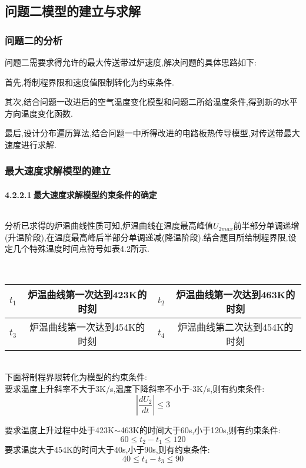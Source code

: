 \documentclass[12pt]{ctexart}
\numberwithin{figure}{section}
\numberwithin{table}{section}
\begin{document}
\subsection{问题二模型的建立与求解}
\subsubsection{问题二的分析}
问题二需要求得允许的最大传送带过炉速度,解决问题的具体思路如下:

首先,将制程界限和速度值限制转化为约束条件.

其次,结合问题一改进后的空气温度变化模型和问题二所给温度条件,得到新的水平方向温度变化函数.

最后,设计分布遍历算法,结合问题一中所得改进的电路板热传导模型,对传送带最大速度进行求解.
\subsubsection{最大速度求解模型的建立}
\paragraph{4.2.2.1$\ $最大速度求解模型约束条件的确定}$\ $

分析已求得的炉温曲线性质可知,炉温曲线在温度最高峰值$U_{2max}$前半部分单调递增(升温阶段),在温度最高峰后半部分单调递减(降温阶段).结合题目所给制程界限,设定几个特殊温度时间点符号如表4.2所示.
\begin{longtable}
\centering
\setlength{\abovecaptionskip}{0pt}
\caption{特殊时间节点符号表}
\label{}\\
\begin{tabular}{|c|c|c|c|}
\hline
$t_1$&炉温曲线第一次达到423K的时刻&$t_2$&炉温曲线第一次达到463K的时刻\\
\hline
$t_3$&炉温曲线第一次达到454K的时刻&$t_4$&炉温曲线第二次达到454K的时刻\\
\hline
    \end{tabular}
    \end{longtable}\\
下面将制程界限转化为模型的约束条件:\\
要求温度上升斜率不大于3K/s,温度下降斜率不小于-3K/s,则有约束条件:
\begin{equation}
    \left|\frac{d U_2}{d t}\right|\leq3
\end{equation}

要求温度上升过程中处于423K$\sim $463K的时间大于60s,小于120s,则有约束条件:
\begin{equation}
    60\leq t_2-t_1\leq120
\end{equation}
要求温度大于454K的时间大于40s,小于90s,则有约束条件:
\begin{equation}
40\leq t_4-t_3\leq90
\end{equation}
\end{document}
